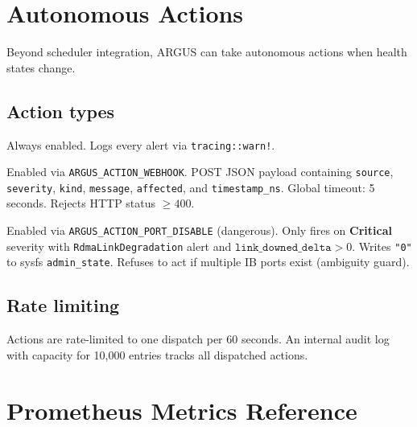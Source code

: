 \documentclass[11pt]{article}
\begin{document}
\section{Autonomous Actions}
\label{sec:actions}

Beyond scheduler integration, ARGUS can take autonomous actions when health
states change.

\subsection{Action types}

\begin{description}[style=nextline,leftmargin=0.5cm]
  \item[Log action]
    Always enabled. Logs every alert via \texttt{tracing::warn!}.
  \item[Webhook]
    Enabled via \texttt{ARGUS\_ACTION\_WEBHOOK}. POST JSON payload
    containing \texttt{source}, \texttt{severity}, \texttt{kind},
    \texttt{message}, \texttt{affected}, and \texttt{timestamp\_ns}.
    Global timeout: 5 seconds. Rejects HTTP status $\geq 400$.
  \item[Port disable]
    Enabled via \texttt{ARGUS\_ACTION\_PORT\_DISABLE} (dangerous). Only
    fires on \textbf{Critical} severity with
    \texttt{RdmaLinkDegradation} alert and $\texttt{link\_downed\_delta} > 0$.
    Writes \texttt{"0"} to sysfs \texttt{admin\_state}. Refuses to act if
    multiple IB ports exist (ambiguity guard).
\end{description}

\subsection{Rate limiting}

Actions are rate-limited to one dispatch per 60 seconds. An internal audit
log with capacity for 10,000 entries tracks all dispatched actions.


\section{Prometheus Metrics Reference}
\label{sec:metrics-ref}
\end{document}
